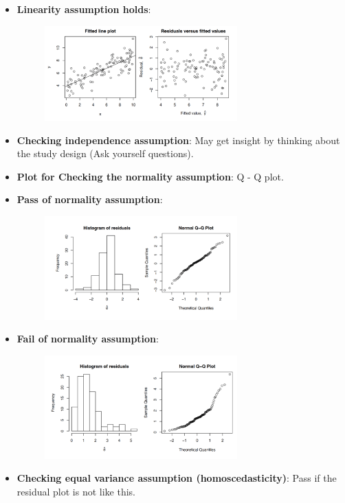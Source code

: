\documentclass[12pt]{book}
\begin{document}
\begin{itemize}
\begin{figure}[H]
\end{figure}
\item \textbf{Linearity assumption holds}: 
\begin{figure}[H]
    \centering
    \includegraphics[width=0.7\textwidth]{3.png}
\end{figure}
\item \textbf{Checking independence assumption}: May get insight by thinking about the study design (Ask yourself questions).
\item \textbf{Plot for Checking the normality assumption}: Q - Q plot.
\item \textbf{Pass of normality assumption}: 
\begin{figure}[H]
    \centering
    \includegraphics[width=0.7\textwidth]{4.png}
\end{figure}
\item \textbf{Fail of normality assumption}: 
\begin{figure}[H]
    \centering
    \includegraphics[width=0.7\textwidth]{5.png}
\end{figure}
\item \textbf{Checking equal variance assumption (homoscedasticity)}: Pass if the residual plot is not like this.

\end{itemize}
\end{document}
